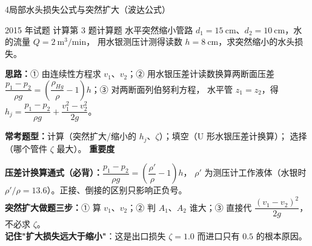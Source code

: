 \begin{kaodian}{4}{局部水头损失公式与突然扩大（波达公式）}
\begin{zhenti}{2015 年试题 计算第 3 题}{计算题}
水平突然缩小管路 $d_1=15\ \mathrm{cm}$、$d_2=10\ \mathrm{cm}$，水的流量 $Q=2\ \mathrm{m^3/min}$，
用水银测压计测得读数 $h=8\ \mathrm{cm}$，求突然缩小的水头损失。
\end{zhenti}
\noindent\textbf{思路：}① 由连续性方程求 $v_1$、$v_2$；② 用水银压差计读数换算两断面压差
$\dfrac{p_1-p_2}{\rho g}=\left(\dfrac{\rho_{Hg}}{\rho}-1\right)h$；③ 对两断面列伯努利方程，
水平管 $z_1=z_2$，得 $h_j=\dfrac{p_1-p_2}{\rho g}+\dfrac{v_1^2-v_2^2}{2g}$。

\textbf{常考题型：}计算（突然扩大/缩小的 $h_j$、$\zeta$）；填空（U 形水银压差计换算）；
选择（哪个管件 $\zeta$ 最大）。
\textbf{重要度 }\quad{}\quad{}

\begin{banfa}
\textbf{压差计换算通式（必背）：}$\dfrac{p_1-p_2}{\rho g}=\left(\dfrac{\rho'}{\rho}-1\right)h$，
$\rho'$ 为测压计工作液体（水银时 $\rho'/\rho=13.6$）。正接、倒接的区别只影响正负号。\\
\textbf{突然扩大做题三步：}① 算 $v_1$、$v_2$；② 判 $A_1$、$A_2$ 谁大；③ 直接代 $\dfrac{(v_1-v_2)^2}{2g}$，
不必求 $\zeta$。\\
\textbf{记住"扩大损失远大于缩小"}：这是出口损失 $\zeta=1.0$ 而进口只有 $0.5$ 的根本原因。
\end{banfa}
\end{kaodian}

